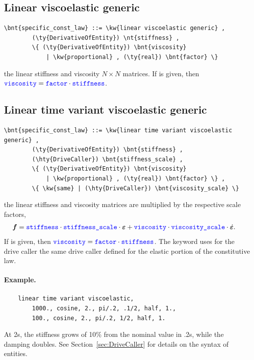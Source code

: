 \subsection{Linear viscoelastic generic}
\begin{Verbatim}[commandchars=\\\{\}]
    \bnt{specific_const_law} ::= \kw{linear viscoelastic generic} ,  
        (\ty{DerivativeOfEntity}) \nt{stiffness} ,
        \{ (\ty{DerivativeOfEntity}) \bnt{viscosity} 
            | \kw{proportional} , (\ty{real}) \bnt{factor} \}
\end{Verbatim}
the linear stiffness and viscosity $N \times N$ matrices.
If  is given, then
$\textcolor{blue}{\texttt{viscosity}} = \textcolor{blue}{\texttt{factor}} \cdot \textcolor{blue}{\texttt{stiffness}}$.
  
\subsection{Linear time variant viscoelastic generic}
\begin{Verbatim}[commandchars=\\\{\}]
    \bnt{specific_const_law} ::= \kw{linear time variant viscoelastic generic} ,
        (\ty{DerivativeOfEntity}) \bnt{stiffness} ,
        (\hty{DriveCaller}) \bnt{stiffness_scale} ,
        \{ (\ty{DerivativeOfEntity}) \bnt{viscosity}
            | \kw{proportional} , (\ty{real}) \bnt{factor} \} ,
        \{ \kw{same} | (\hty{DriveCaller}) \bnt{viscosity_scale} \}
\end{Verbatim}
the linear stiffness and viscosity matrices are multiplied
by the respective scale factors,
\begin{align}
	\boldsymbol{f} &= \textcolor{blue}{\texttt{stiffness}} \cdot \textcolor{blue}{\texttt{stiffness\_scale}} \cdot \boldsymbol{\varepsilon}
		+ \textcolor{blue}{\texttt{viscosity}} \cdot \textcolor{blue}{\texttt{viscosity\_scale}} \cdot \dot{\boldsymbol{\varepsilon}}
	.
\end{align}
If  is given, then
$\textcolor{blue}{\texttt{viscosity}} = \textcolor{blue}{\texttt{factor}} \cdot \textcolor{blue}{\texttt{stiffness}}$.
The keyword  uses for the drive caller  the same drive caller  defined for the elastic portion of the constitutive law.

\paragraph{Example.}
\begin{verbatim}
    linear time variant viscoelastic,
        1000., cosine, 2., pi/.2, .1/2, half, 1.,
        100., cosine, 2., pi/.2, 1/2, half, 1.
\end{verbatim}
At 2s, the stiffness grows of 10\% from the nominal value in .2s,
while the damping doubles.
See Section~\ref{sec:DriveCaller} for details on the syntax
of  entities.

